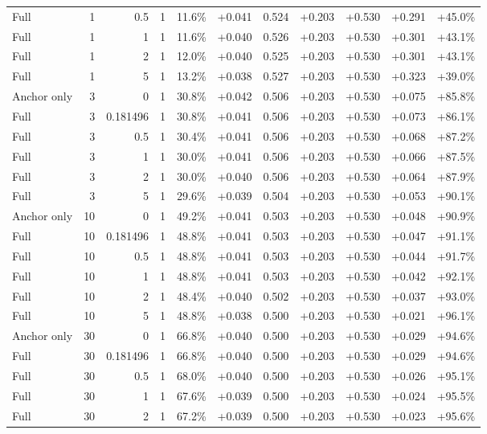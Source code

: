 \begin{table}[htbp]
\begin{tabular}{lrrrccccccc}
Full & 1 & 0.5 & 1 & 11.6\% & +0.041 & 0.524 & +0.203 & +0.530 & +0.291 & +45.0\% \\
Full & 1 & 1 & 1 & 11.6\% & +0.040 & 0.526 & +0.203 & +0.530 & +0.301 & +43.1\% \\
Full & 1 & 2 & 1 & 12.0\% & +0.040 & 0.525 & +0.203 & +0.530 & +0.301 & +43.1\% \\
Full & 1 & 5 & 1 & 13.2\% & +0.038 & 0.527 & +0.203 & +0.530 & +0.323 & +39.0\% \\
Anchor only & 3 & 0 & 1 & 30.8\% & +0.042 & 0.506 & +0.203 & +0.530 & +0.075 & +85.8\% \\
Full & 3 & 0.181496 & 1 & 30.8\% & +0.041 & 0.506 & +0.203 & +0.530 & +0.073 & +86.1\% \\
Full & 3 & 0.5 & 1 & 30.4\% & +0.041 & 0.506 & +0.203 & +0.530 & +0.068 & +87.2\% \\
Full & 3 & 1 & 1 & 30.0\% & +0.041 & 0.506 & +0.203 & +0.530 & +0.066 & +87.5\% \\
Full & 3 & 2 & 1 & 30.0\% & +0.040 & 0.506 & +0.203 & +0.530 & +0.064 & +87.9\% \\
Full & 3 & 5 & 1 & 29.6\% & +0.039 & 0.504 & +0.203 & +0.530 & +0.053 & +90.1\% \\
Anchor only & 10 & 0 & 1 & 49.2\% & +0.041 & 0.503 & +0.203 & +0.530 & +0.048 & +90.9\% \\
Full & 10 & 0.181496 & 1 & 48.8\% & +0.041 & 0.503 & +0.203 & +0.530 & +0.047 & +91.1\% \\
Full & 10 & 0.5 & 1 & 48.8\% & +0.041 & 0.503 & +0.203 & +0.530 & +0.044 & +91.7\% \\
Full & 10 & 1 & 1 & 48.8\% & +0.041 & 0.503 & +0.203 & +0.530 & +0.042 & +92.1\% \\
Full & 10 & 2 & 1 & 48.4\% & +0.040 & 0.502 & +0.203 & +0.530 & +0.037 & +93.0\% \\
Full & 10 & 5 & 1 & 48.8\% & +0.038 & 0.500 & +0.203 & +0.530 & +0.021 & +96.1\% \\
Anchor only & 30 & 0 & 1 & 66.8\% & +0.040 & 0.500 & +0.203 & +0.530 & +0.029 & +94.6\% \\
Full & 30 & 0.181496 & 1 & 66.8\% & +0.040 & 0.500 & +0.203 & +0.530 & +0.029 & +94.6\% \\
Full & 30 & 0.5 & 1 & 68.0\% & +0.040 & 0.500 & +0.203 & +0.530 & +0.026 & +95.1\% \\
Full & 30 & 1 & 1 & 67.6\% & +0.039 & 0.500 & +0.203 & +0.530 & +0.024 & +95.5\% \\
Full & 30 & 2 & 1 & 67.2\% & +0.039 & 0.500 & +0.203 & +0.530 & +0.023 & +95.6\% \\

\end{tabular}
\end{table}
